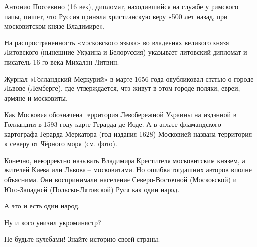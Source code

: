Антонио Поссевино (16 век), дипломат, находившийся на службе у римского папы,
пишет, что Руссия приняла христианскую веру «500 лет назад, при московитском
князе Владимире».

На распространённость «московского языка» во владениях великого князя
Литовского (нынешние Украина и Белоруссия) указывает литовский дипломат и
писатель 16-го века Михалон Литвин.

Журнал «Голландский Меркурий» в марте 1656 года опубликовал статью о городе
Львове (Лемберге), где утверждается, что живут в этом городе поляки, евреи,
армяне и московиты.

Как Московия обозначена территория Левобережной Украины на изданной в Голландии
в 1593 году карте  Герарда де Иоде. А в атласе фламандского картографа Герарда
Меркатора (год издания 1628) Московией названа территория к северу от Чёрного
моря (см. фото).

Конечно, некорректно называть Владимира Крестителя московитским князем, а
жителей Киева или Львова – московитами. Но ошибка тогдашних авторов вполне
объяснима. Они воспринимали население Северо-Восточной (Московской) и
Юго-Западной (Польско-Литовской) Руси как один народ.

А это и есть один народ.

Ну и кого унизил укроминистр?

Не будьте кулебами! Знайте историю своей страны.

